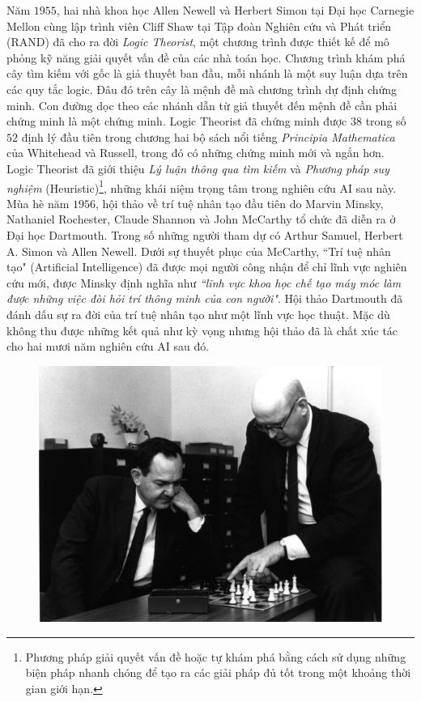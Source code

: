 \begin{multicols}{2}
	Năm $1955$, hai nhà khoa học Allen Newell và Herbert Simon tại Đại học Carnegie Mellon cùng lập trình viên Cliff Shaw tại Tập đoàn Nghiên cứu và Phát triển (RAND) đã cho ra đời \textit{Logic Theorist}, một chương trình được thiết kế để mô phỏng kỹ năng giải quyết vấn đề của các nhà toán học. Chương trình khám phá cây tìm kiếm với gốc là giả thuyết ban đầu, mỗi nhánh là một suy luận dựa trên các quy tắc logic. Đâu đó trên cây là mệnh đề mà chương trình dự định chứng minh. Con đường dọc theo các nhánh dẫn từ giả thuyết đến mệnh đề cần phải chứng minh là một chứng minh. Logic Theorist đã chứng minh được $38$ trong số $52$ định lý đầu tiên trong chương hai bộ sách nổi tiếng \textit{Principia Mathematica} của Whitehead và Russell, trong đó có những chứng minh mới và ngắn hơn. Logic Theorist đã giới thiệu \textit{Lý luận thông qua tìm kiếm} và \textit{Phương pháp suy nghiệm} (Heuristic)\footnote{\color{cackithi}Phương pháp giải quyết vấn đề hoặc tự khám phá bằng cách sử dụng những biện pháp nhanh chóng để tạo ra các giải pháp đủ tốt trong một khoảng thời gian giới hạn.}, những khái niệm trọng tâm trong nghiên cứu AI sau này.
	\vskip 0.1cm
	Mùa hè năm $1956$, hội thảo về trí tuệ nhân tạo đầu tiên do Marvin Minsky, Nathaniel Rochester, Claude Shannon và John McCarthy tổ chức đã diễn ra ở Đại học Dartmouth. Trong số những người tham dự có Arthur Samuel, Herbert A. Simon và Allen Newell. Dưới sự thuyết phục của McCarthy, ``Trí tuệ nhân tạo" (Artificial Intelligence) đã được mọi người công nhận để chỉ lĩnh vực nghiên cứu mới, được Minsky định nghĩa như \textit{``lĩnh vực khoa học chế tạo máy móc làm được những việc đòi hỏi trí thông minh của con người"}. Hội thảo Dartmouth đã đánh dấu sự ra đời của trí tuệ nhân tạo như một lĩnh vực học thuật. Mặc dù không thu được những kết quả như kỳ vọng nhưng hội thảo đã là chất xúc tác cho hai mươi năm nghiên cứu AI sau đó.
	\begin{figure}[H]
		\vspace*{-5pt}
		\centering
		\captionsetup{labelformat= empty, justification=centering}
		\includegraphics[width= 1\linewidth]{Newell_Simon.jpeg}

\end{figure}
\end{multicols}
